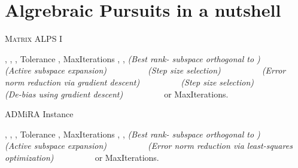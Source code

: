 \documentclass[twocolumn]{svjour3}
\begin{document}
\section{Algrebraic Pursuits in a nutshell}{\label{sec:ALPS}}

\begin{algorithm*}[t!]
   \caption{\textsc{Matrix ALPS I}}\label{algo: class}
\begin{algorithmic}[1]
    , , , Tolerance , MaxIterations
    , , 
    \State \hspace{0.16cm}  \hspace*{\fill}\textit{(Best rank- subspace orthogonal to )~~~~~~~~~}
   \State \hspace{0.16cm}  \hspace*{\fill}\textit{(Active subspace expansion)~~~~~~~~~}
   \State \hspace{0.16cm}  \hspace*{\fill} \textit{(Step size selection)~~~~~~~~~}
   \State \hspace{0.16cm}  \hspace*{\fill} \textit{(Error norm reduction via gradient descent)~~~~~~~~~}
   \State \hspace{0.16cm}  
   \State \hspace{0.16cm}  \hspace*{\fill} \textit{(Step size selection)~~~~~~~~~}
   \State \hspace{0.16cm}  \hspace*{\fill}\textit{(De-bias using gradient descent)~~~~~~~~~}
   \Statex \hspace{0.16cm} 
     or MaxIterations.
\end{algorithmic}
\end{algorithm*}

\begin{algorithm*}[t!]
   \caption{ADMiRA Instance}\label{algo: class}
\begin{algorithmic}[1]
    , , , Tolerance , MaxIterations
    , , 
   \State \hspace{0.16cm}  \hspace*{\fill}\textit{(Best rank- subspace orthogonal to )~~~~~~~~~}
   \State \hspace{0.16cm}  \hspace*{\fill}\textit{(Active subspace expansion)~~~~~~~~~}
   \State \hspace{0.16cm}  \hspace*{\fill} \textit{(Error norm reduction via least-squares optimization)~~~~~~~~~}
   \State \hspace{0.16cm}  
   \Statex \hspace{0.16cm} 
     or MaxIterations.
\end{algorithmic}
\end{algorithm*}
\end{document}

